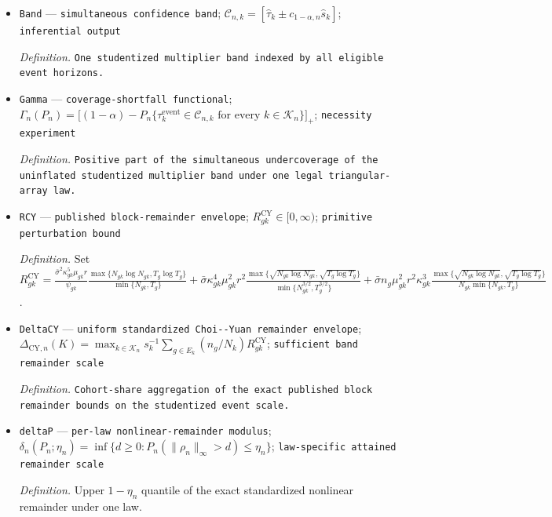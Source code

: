\documentclass{article}
\begin{document}
\begin{itemize}
  \par\smallskip\noindent\emph{Definition.} Conditional \(1-\alpha\) quantile of the Gaussian-multiplier maximum.
  \item \texttt{Band} --- \texttt{simultaneous confidence band}; \(\mathcal C_{n,k}=[\widehat\tau_k\pm c_{1-\alpha,n}\widehat s_k]\); \texttt{inferential output}
  \par\smallskip\noindent\emph{Definition.} \texttt{One studentized multiplier band indexed by all eligible event horizons.}
  \item \texttt{Gamma} --- \texttt{coverage-\allowbreak{}shortfall functional}; \(\Gamma_n(P_n)=\bigl[(1-\alpha)-P_n\{\tau_k^{\mathrm{event}}\in\mathcal C_{n,k}\text{ for every }k\in\mathcal K_n\}\bigr]_+\); \texttt{necessity experiment}
  \par\smallskip\noindent\emph{Definition.} \texttt{Positive part of the simultaneous undercoverage of the uninflated studentized multiplier band under one legal triangular-\allowbreak{}array law.}
  \item \texttt{RCY} --- \texttt{published block-\allowbreak{}remainder envelope}; \(R_{gk}^{\mathrm{CY}}\in[0,\infty)\); \texttt{primitive perturbation bound}
  \par\smallskip\noindent\emph{Definition.} Set \(R_{gk}^{\mathrm{CY}}=\frac{\bar\sigma^2\kappa_{gk}^5\mu_{gk}r}{\psi_{gk}}\frac{\max\{N_{gk}\log N_{gk},T_g\log T_g\}}{\min\{N_{gk},T_g\}}+\bar\sigma\kappa_{gk}^4\mu_{gk}^2r^2\frac{\max\{\sqrt{N_{gk}\log N_{gk}},\sqrt{T_g\log T_g}\}}{\min\{N_{gk}^{3/2},T_g^{3/2}\}}+\bar\sigma n_g\mu_{gk}^2r^2\kappa_{gk}^3\frac{\max\{\sqrt{N_{gk}\log N_{gk}},\sqrt{T_g\log T_g}\}}{N_{gk}\min\{N_{gk},T_g\}}\).
  \item \texttt{DeltaCY} --- \texttt{uniform standardized Choi-\allowbreak{}-\allowbreak{}Yuan remainder envelope}; \(\Delta_{\mathrm{CY},n}(K)=\max_{k\in\mathcal K_n}s_k^{-1}\sum_{g\in E_k}(n_g/N_k)R_{gk}^{\mathrm{CY}}\); \texttt{sufficient band remainder scale}
  \par\smallskip\noindent\emph{Definition.} \texttt{Cohort-\allowbreak{}share aggregation of the exact published block remainder bounds on the studentized event scale.}
  \item \texttt{deltaP} --- \texttt{per-\allowbreak{}law nonlinear-\allowbreak{}remainder modulus}; \(\delta_n(P_n;\eta_n)=\inf\{d\ge0:P_n(\|\rho_n\|_\infty>d)\le\eta_n\}\); \texttt{law-\allowbreak{}specific attained remainder scale}
  \par\smallskip\noindent\emph{Definition.} Upper \(1-\eta_n\) quantile of the exact standardized nonlinear remainder under one law.

\end{itemize}
\end{document}
